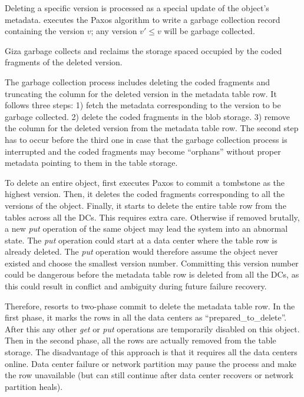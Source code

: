 Deleting a specific version is processed as a special update of the object's metadata.
\name executes the Paxos algorithm to write a garbage collection record containing
the version $v$; any version $v'\leq v$ will be garbage collected.  

Giza garbage collects and reclaims the storage spaced occupied by the coded fragments of the deleted version.

The garbage collection process includes deleting the coded fragments and
truncating the column for the deleted version in the metadata table row.
It follows three steps:
1) fetch the metadata corresponding to the version to be garbage collected.
2) delete the coded fragments in the blob storage.
3) remove the column for the deleted version from the metadata table row.
The second step has to occur before the third one in case that
the garbage collection process is interrupted and the coded fragments may become ``orphans''
without proper metadata pointing to them in the table storage.

To delete an entire object, 
{\name} first executes Paxos to commit a tombstone as the highest version.
Then, it deletes the coded fragments corresponding to all the versions of the object.
Finally, it starts to delete the entire table row from the tables across all the DCs.
This requires extra care. Otherwise if removed brutally, 
a new {\em put} operation of the same object may lead the system into an abnormal state.
The {\em put} operation could start at a data center where the table row is already deleted.
The {\em put} operation would therefore assume the object never existed and choose the smallest version number.
Committing this version number could be dangerous before the metadata table row is deleted from all the DCs,
as this could result in conflict and ambiguity during future failure recovery.

Therefore, {\name} resorts to two-phase commit to delete the metadata table row.
In the first phase, it marks the rows in all the data centers as ``prepared\_to\_delete''.
After this any other {\em get} or {\em put} operations are temporarily disabled on this object.
Then in the second phase, all the rows are actually removed from the table storage.
The disadvantage of this approach is that it requires all the data centers online.
Data center failure or network partition may pause the process and make the row unavailable
(but can still continue after data center recovers or network partition heals). 



